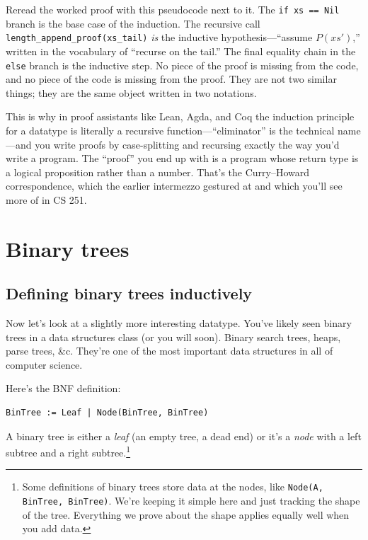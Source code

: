\documentclass[11pt]{article}
\begin{document}
Reread the worked proof with this pseudocode next to it. The \texttt{if xs == Nil} branch is the base case of the induction. The recursive call \texttt{length\_append\_proof(xs\_tail)} \emph{is} the inductive hypothesis---``assume $P(xs')$,'' written in the vocabulary of ``recurse on the tail.'' The final equality chain in the \texttt{else} branch is the inductive step. No piece of the proof is missing from the code, and no piece of the code is missing from the proof. They are not two similar things; they are the same object written in two notations.

This is why in proof assistants like Lean, Agda, and Coq the induction principle for a datatype is literally a recursive function---``eliminator'' is the technical name---and you write proofs by case-splitting and recursing exactly the way you'd write a program. The ``proof'' you end up with is a program whose return type is a logical proposition rather than a number. That's the Curry--Howard correspondence, which the earlier intermezzo gestured at and which you'll see more of in CS 251.

\section{Binary trees}

\subsection{Defining binary trees inductively}

Now let's look at a slightly more interesting datatype. You've likely seen binary trees in a data structures class (or you will soon). Binary search trees, heaps, parse trees, \&c. They're one of the most important data structures in all of computer science.

Here's the BNF definition:

\begin{definition}
\begin{lstlisting}
BinTree := Leaf | Node(BinTree, BinTree)
\end{lstlisting}
A binary tree is either a \emph{leaf} (an empty tree, a dead end) or it's a \emph{node} with a left subtree and a right subtree.\footnote{Some definitions of binary trees store data at the nodes, like \texttt{Node(A, BinTree, BinTree)}. We're keeping it simple here and just tracking the shape of the tree. Everything we prove about the shape applies equally well when you add data.}
\end{definition}
\end{document}

